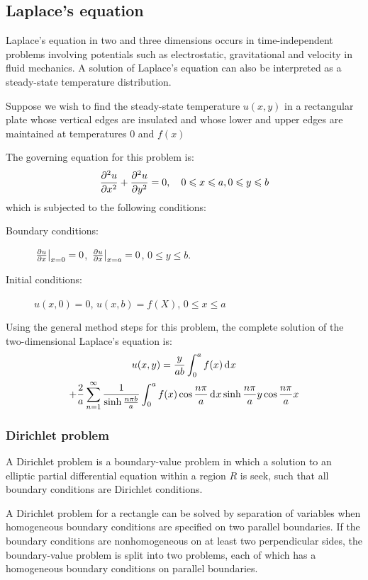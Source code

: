 \documentclass[10pt, twocolumn]{article}
\begin{document}
\subsection{Laplace's equation}
Laplace's equation in two and three dimensions occurs in time-independent problems involving potentials such as electrostatic, gravitational and velocity in fluid mechanics.
A solution of Laplace's equation can also be interpreted as a steady-state temperature distribution.

Suppose we wish to find the steady-state temperature \(u(x,y)\) in a rectangular plate whose vertical edges are insulated and whose lower and upper edges are maintained at temperatures 0 and \(f(x)\)

The governing equation for this problem is:
\[
  \frac{\partial^{2} u}{\partial x^{2}} + \frac{\partial^{2} u}{\partial y^{2}} = 0, \quad 0 \leqslant x \leqslant a, 0 \leqslant y \leqslant b
\]
which is subjected to the following conditions:
\begin{description}
  \item[Boundary conditions:] \(\left. \frac{\partial u}{\partial x} \right|_{x = 0} = 0\), \(\left. \frac{\partial u}{\partial x} \right|_{x = a} = 0\), \(0 \leqslant y \leqslant b\).
  \item[Initial conditions:] \(u(x,0) = 0\), \(u(x,b) = f(X)\), \(0 \leqslant x \leqslant a\)
\end{description}

Using the general method steps for this problem, the complete solution of the two-dimensional Laplace's equation is:
\begin{multline*}
  u(x,y) = \frac{y}{ab} \int_0^a{f(x) \,\mathrm{d}^{} x} \\
  + \frac{2}{a} \sum_{n = 1}^\infty{\frac{1}{\sinh\frac{n \pi b}{a}} \int_0^a{f(x) \cos\frac{n \pi}{a} \,\mathrm{d}^{} x}} \sinh\frac{n \pi}{a}y \cos\frac{n \pi}{a}x
\end{multline*}


\subsubsection{Dirichlet problem}
A Dirichlet problem is a boundary-value problem in which a solution to an elliptic partial differential equation within a region \(R\) is seek, such that all boundary conditions are Dirichlet conditions.

A Dirichlet problem for a rectangle can be solved by separation of variables when homogeneous boundary conditions are specified on two parallel boundaries.
If the boundary conditions are nonhomogeneous on at least two perpendicular sides, the boundary-value problem is split into two problems, each of which has a homogeneous boundary conditions on parallel boundaries.
\end{document}
